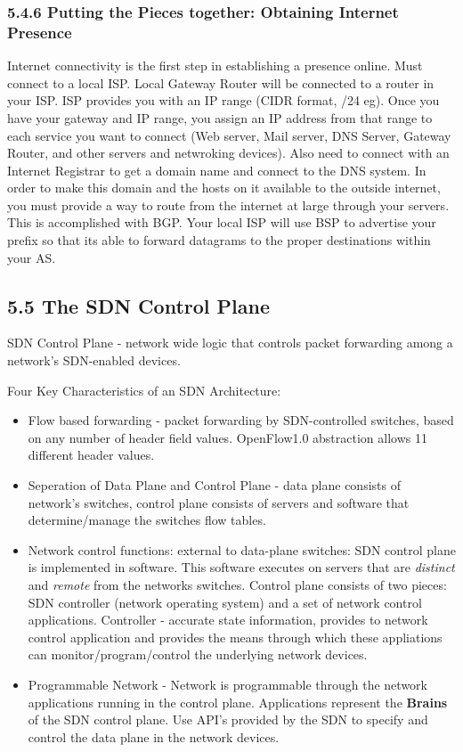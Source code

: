 \documentclass[11pt]{article}
\begin{document}
\subsubsection{5.4.6 Putting the Pieces together: Obtaining Internet Presence}
\label{sec:org9307aad}
Internet connectivity is the first step in establishing a presence online.
Must connect to a local ISP.
Local Gateway Router will be connected to a router in your ISP.
ISP provides you with an IP range (CIDR format, /24 eg).
Once you have your gateway and IP range, you assign an IP address from that range to each service you want to connect (Web server, Mail server, DNS Server, Gateway Router, and other servers and netwroking devices).
Also need to connect with an Internet Registrar to get a domain name and connect to the DNS system.
In order to make this domain and the hosts on it available to the outside internet, you must provide a way to route from the internet at large through your servers.
This is accomplished with BGP. Your local ISP will use BSP to advertise your prefix so that its able to forward datagrams to the proper destinations within your AS.

\subsection{5.5 The SDN Control Plane}
\label{sec:orgf71bbf3}

SDN Control Plane - network wide logic that controls packet forwarding among a network's SDN-enabled devices.

Four Key Characteristics of an SDN Architecture:
\begin{itemize}
\item Flow based forwarding - packet forwarding by SDN-controlled switches, based on any number of header field values. OpenFlow1.0 abstraction allows 11 different header values.
\item Seperation of Data Plane and Control Plane - data plane consists of network's switches, control plane consists of servers and software that determine/manage the switches flow tables.
\item Network control functions: external to data-plane switches: SDN control plane is implemented in software. This software executes on servers that are \emph{distinct} and \emph{remote} from the networks switches. Control plane consists of two pieces: SDN controller (network operating system) and a set of network control applications. Controller - accurate state information, provides to network control application and provides the means through which these appliations can monitor/program/control the underlying network devices.
\item Programmable Network - Network is programmable through the network applications running in the control plane. Applications represent the \textbf{Brains} of the SDN control plane. Use API's provided by the SDN to specify and control the data plane in the network devices.
\end{itemize}
\end{document}
